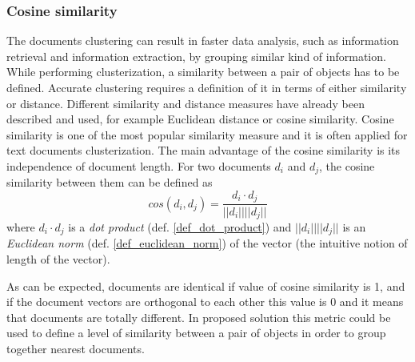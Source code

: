\subsubsection{Cosine similarity}
 The documents clustering can result in faster data analysis, such  as  information retrieval  and  information  extraction,  by  grouping  similar kind  of  information. While performing clusterization, a similarity between a pair of objects has to be defined. Accurate clustering requires a definition of it in terms of either similarity or distance. Different similarity and distance measures have already been described and used, for example Euclidean  distance or cosine  similarity. Cosine  similarity  is  one  of  the  most  popular  similarity  measure and it is often  applied for  text  documents clusterization. The main advantage of the cosine similarity is its independence of document length. For two documents \(d_i\) and \(d_j\), the cosine similarity between them can be defined as
\[cos(d_i, d_j)=\frac{d_i \cdot d_j}{|| d_i || ||d_j ||}\]
where \(d_i \cdot d_j\) is a \textit{dot product} (def. \ref{def_dot_product}) and \(|| d_i || ||d_j ||\) is an \textit{Euclidean norm} (def. \ref{def_euclidean_norm}) of the vector (the intuitive notion of length of the vector).

 \begin{definition}
 	\label{def_dot_product}
 \end{definition}
 
  \begin{definition}
  	\label{def_euclidean_norm}
  \end{definition}

As can be expected, documents are identical if value of cosine similarity is 1, and if the 
document vectors are orthogonal to each other this value is 0 and it means that documents are totally different.
In proposed solution this metric could be used to define a level of similarity between a pair of objects in order to group together nearest documents.

